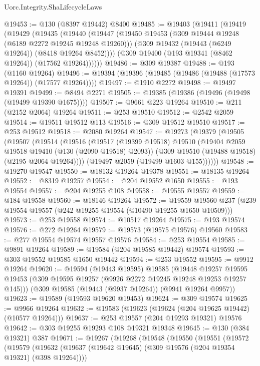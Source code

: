 \begin{lexlean}{Uorc.Integrity.ShaLifecycleLaws}
\begin{coremodule}
@19453 := @130 (@8397 @19442) @8400
@19485 := @19403
    (@19411
      (@19419
        (@19429
          (@19435
            (@19440
              (@19447
                (@19450 @19453 (@309 @19444 @19248 (@6189 @2272 @19245 @19248 @19260)))
                (@309 @19432 (@19443 (@6249 @19264)) (@8418 @19264 @8452))))
            (@309 @19400 (@193 @19341 (@8462 @19264)) (@17562 @19264))))))
@19486 := @309 @19387
@19488 := @193 (@1160 @19264)
@19496 := @19394 (@19396 (@19485 (@19486 (@19488 (@17573 @19264)) (@17577 @19264))))
@19497 := @1910 @2272
@19498 := @19497 @19391
@19499 := @8494 @2271
@19505 := @19385 (@19386 (@19496 (@19498 (@19499 @19390 @1675))))
@19507 := @9661 @223 @19264
@19510 := @211 (@2152 @2064) @19264
@19511 := @253 @19510
@19512 := @2542 @2059
@19514 := @19511 @19512 @113
@19516 := @309 @19512 @19510
@19517 := @253 @19512
@19518 := @2080 @19264
@19547 := @19273
    (@19379
      (@19505
        (@19507
          (@19514
            (@19516
              (@19517
                (@19399 @19518)
                @19510
                (@19404 @2059 @19518 @19410 (@130 (@2090 @19518) @2093))
                (@309 @19510 (@19488 @19518) (@2195 @2064 @19264))))
            (@19497 @2059 (@19499 @1603 @155))))))
@19548 := @19270 @19547
@19550 := @18132 @19264 @19378
@19551 := @18135 @19264
@19552 := @8319 @19257
@19554 := @204 @19552 @1650
@19555 := @193 @19554
@19557 := @204 @19255 @108
@19558 := @19555 @19557
@19559 := @184 @19558
@19560 := @18146 @19264
@19572 := @19559 @19560 @237 (@239 @19554 @19557 (@242 @19255 @19554 (@10490 @19255 @1650 @10509)))
@19573 := @253 @19558
@19574 := @10517 @19264
@19575 := @193 @19574
@19576 := @272 @19264
@19579 := @19573 (@19575 @19576) @19560
@19583 := @277 @19554 @19574 @19557 @19576
@19584 := @253 @19554
@19585 := @9891 @19264
@19589 := @19584 (@204 @19585 @19442) @19574
@19593 := @303 @19552 @19585 @1650 @19442
@19594 := @253 @19552
@19595 := @9912 @19264
@19620 := @19594
    (@19443 @19595)
    @19585
    (@19448
      @19257
      @19595
      @19453
      (@309 @19595 @19257 (@9926 @2272 @19245 @19248 @19253 @19257 @145)))
    (@309 @19585 (@19443 (@9937 @19264)) (@9941 @19264 @9957))
@19623 := @19589 (@19593 @19620 @19453)
@19624 := @309 @19574
@19625 := @9966 @19264
@19632 := @19583 (@19623 (@19624 (@204 @19625 @19442) (@10577 @19264)))
@19637 := @253 @19557 (@204 @19293 @19321) @19576
@19642 := @303 @19255 @19293 @108 @19321 @19348
@19645 := @130 (@384 @19321) @387
@19671 := @19267
    (@19268
      (@19548
        (@19550
          (@19551
            (@19572
              (@19579
                (@19632 (@19637 (@19642 @19645) (@309 @19576 (@204 @19354 @19321) (@398 @19264))))

\end{coremodule}
\end{lexlean}

